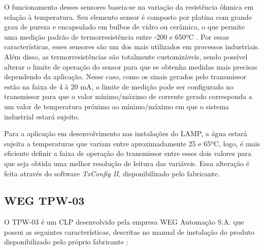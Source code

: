 O funcionamento desses sensores baseia-se na variação da resistência ôhmica em relação à temperatura. Seu elemento sensor é composto por platina com grande grau de pureza e encapsulado em bulbos de vidro ou cerâmica, o que permite uma medição padrão de termorresistência entre -200 e 650ºC \cite{salcas2015site}. Por essas características, esses sensores são um dos mais utilizados em processos industriais. Além disso, as termorresistências são totalmente customizáveis, sendo possível alterar o limite de operação do sensor para que se obtenha medidas mais precisas dependendo da aplicação. Nesse caso, como os sinais gerados pelo transmissor estão na faixa de 4 à 20 mA, o limite de medição pode ser configurado no transmissor para que o valor mínimo/máximo de corrente gerado corresponda a um valor de temperatura próximo ao mínimo/máximo em que o sistema industrial estará sujeito.

Para a aplicação em desenvolvimento nas instalações do LAMP, a água estará sujeita a temperaturas que variam entre aproximadamente 25 e 65ºC, logo, é mais eficiente definir a faixa de operação do transmissor entre esses dois valores para que seja obtida uma melhor resolução de leitura das variáveis. Essa alteração é feita através do software \textit{TxConfig II}, disponibilizado pelo fabricante.



\subsection{WEG TPW-03}

O TPW-03 é um CLP desenvolvido pela empresa WEG Automação S.A. que possui as seguintes características, descritas no manual de instalação do produto disponibilizado pelo próprio fabricante \cite{weg2010manualinstalacao}:

